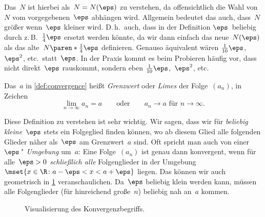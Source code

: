 \documentclass[a4paper]{article}
\begin{document}
\begin{remark}
    Das~$N$ ist hierbei als~$N = N(\eps)$ zu verstehen, da offensichtlich die Wahl von~$N$ vom vorgegebenen~$\eps$ abhängen wird. Allgemein bedeutet das auch, dass~$N$ größer wenn~$\eps$ kleiner wird. D.\,h.\ auch, dass in der Definition $\eps$~beliebig durch z.\,B.\ $\frac{1}{4}\eps$ ersetzt werden könnte, da wir dann einfach das neue~$N(\eps)$ als das alte~$N\paren*{\frac{1}{4}\eps}$ definieren. Genauso äquivalent wären $\frac{1}{10}\eps$,~$\eps^2$, etc.\ statt~$\eps$. In der Praxis kommt es beim Probieren häufig vor, dass nicht direkt~$\eps$ rauskommt, sondern eben $\frac{1}{10}\eps$,~$\eps^2$, etc.
\end{remark}

\begin{definition}
    Das~$a$ in \cref{def:convergence} heißt \emph{Grenzwert} oder \emph{Limes} der Folge~$(a_n)$, in Zeichen
    \begin{equation*}
        \lim_{n\to\infty} a_n = a \qquad\text{oder}\qquad a_n \to a \text{ für } n \to \infty.
    \end{equation*}
\end{definition}

Diese Definition zu verstehen ist sehr wichtig. Wir sagen, dass wir für \emph{beliebig kleine}~$\eps$ stets ein Folgeglied finden können, wo ab diesem Glied alle folgenden Glieder näher als~$\eps$ am Grenzwert~$a$ sind. Oft spricht man auch von einer \emph{$\eps$"~Umgebung} um~$a$: Eine Folge~$(a_n)$ ist genau dann konvergent, wenn für alle~$\eps > 0$ \emph{schließlich alle} Folgenglieder in der Umgebung $\mset{x \in \R\colon a-\eps < x < a+\eps}$ liegen. Das können wir auch geometrisch in \cref{fig:convergence} veranschaulichen. Da~$\eps$ beliebig klein werden kann, müssen alle Folgenglieder (für hinreichend große~$n$) beliebig nah an~$a$ kommen.

\begin{figure}
    \caption{Visualisierung des Konvergenzbegriffs.}\label{fig:convergence}
\end{figure}
\end{document}
